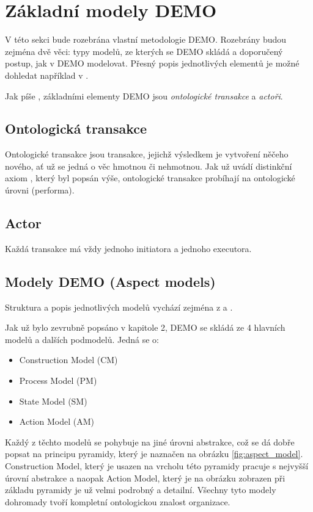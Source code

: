 \section{Základní modely DEMO}
V této sekci bude rozebrána vlastní metodologie DEMO. Rozebrány budou zejména dvě věci: typy modelů, ze kterých se DEMO skládá a doporučený postup, jak v DEMO modelovat. Přesný popis jednotlivých elementů je možné dohledat například v \cite{Dietz2006}.

Jak píše \cite{Vejrazkova2012}, základními elementy DEMO jsou \textit{ontologické transakce} a \textit{actoři}.

\subsection{Ontologická transakce}
Ontologické transakce jsou transakce, jejichž výsledkem je vytvoření něčeho nového, ať už se jedná o věc hmotnou či nehmotnou. Jak už uvádí distinkční axiom \ptheory, který byl popsán výše, ontologické transakce probíhají na ontologické úrovni (performa).

\subsection{Actor}
Každá transakce má vždy jednoho initiatora a jednoho executora.

\subsection{Modely DEMO (Aspect models)}
Struktura a popis jednotlivých modelů vychází zejména z \cite{Vejrazkova2012} a \cite{Dietz2005}.

Jak už bylo zevrubně popsáno v kapitole 2, %
DEMO se skládá ze 4 hlavních modelů a dalších podmodelů. Jedná se o:

\begin{itemize}
\item Construction Model (CM)
\item Process Model (PM)
\item State Model (SM)
\item Action Model (AM)
\end{itemize}

Každý z těchto modelů se pohybuje na jiné úrovni abstrakce, což se dá dobře popsat na principu pyramidy, který je naznačen na obrázku \ref{fig:aspect_model}.
Construction Model, který je usazen na vrcholu této pyramidy pracuje s nejvyšší úrovní abstrakce a naopak Action Model, který je na obrázku zobrazen při základu pyramidy je už velmi podrobný a detailní. Všechny tyto modely dohromady tvoří kompletní ontologickou znalost organizace.

